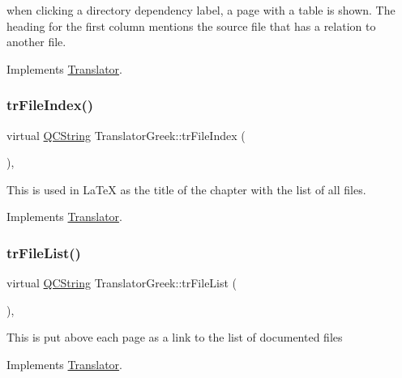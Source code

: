 when clicking a directory dependency label, a page with a table is shown. The heading for the first column mentions the source file that has a relation to another file. 

Implements \mbox{\hyperlink{class_translator}{Translator}}.

\mbox{\label{class_translator_greek_a0d250daa1d5b1081dfc1ee500b80301c}} 
\subsubsection{\texorpdfstring{trFileIndex()}{trFileIndex()}}
{\footnotesize\ttfamily virtual \mbox{\hyperlink{class_q_c_string}{Q\+C\+String}} Translator\+Greek\+::tr\+File\+Index (\begin{DoxyParamCaption}{ }\end{DoxyParamCaption})\hspace{0.3cm}{\ttfamily [inline]}, {\ttfamily [virtual]}}

This is used in La\+TeX as the title of the chapter with the list of all files. 

Implements \mbox{\hyperlink{class_translator}{Translator}}.

\mbox{\label{class_translator_greek_adca938edba09db1d0d70b284a4e3712e}} 
\subsubsection{\texorpdfstring{trFileList()}{trFileList()}}
{\footnotesize\ttfamily virtual \mbox{\hyperlink{class_q_c_string}{Q\+C\+String}} Translator\+Greek\+::tr\+File\+List (\begin{DoxyParamCaption}{ }\end{DoxyParamCaption})\hspace{0.3cm}{\ttfamily [inline]}, {\ttfamily [virtual]}}

This is put above each page as a link to the list of documented files 

Implements \mbox{\hyperlink{class_translator}{Translator}}.

\mbox{\label{class_translator_greek_a3da397b2bd5fd0a3e8055ff4ca6bbbe3}} 
